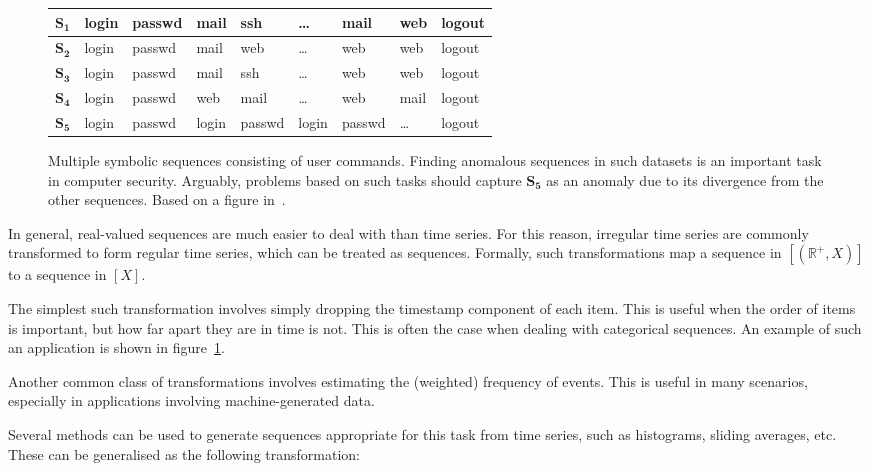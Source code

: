 \begin{figure}[htb]
    \begin{center}
        \begin{tabular}{| l | l l l l l l l l |}
            \hline
            $\mathbf{S_1}$ & login & passwd & mail & ssh & \dots & mail & web & logout \\ \hline
            $\mathbf{S_2}$ & login & passwd & mail & web & \dots & web & web & logout \\ \hline
            $\mathbf{S_3}$ & login & passwd & mail & ssh & \dots & web & web & logout \\ \hline
            $\mathbf{S_4}$ & login & passwd & web & mail & \dots & web & mail & logout \\ \hline
            $\mathbf{S_5}$ & login & passwd & login & passwd & login & passwd & \dots & logout \\\hline
        \end{tabular}
    \end{center}
    \caption{{\small Multiple symbolic sequences consisting of user commands. Finding anomalous sequences in such datasets is an important task in computer security. Arguably, problems based on such tasks should capture $\mathbf{S_5}$ as an anomaly due to its divergence from the other sequences. Based on a figure in~\cite{chandola2}.}}
\label{fig:calls}
\end{figure}

In general, real-valued sequences are much easier to deal with than time series. For this reason, irregular time series are commonly transformed to form regular time series, which can be treated as sequences. Formally, such transformations map a sequence in $[(\mathbb{R}^+, X)]$ to a sequence in $[X]$.

The simplest such transformation involves simply dropping the timestamp component of each item. This is useful when the order of items is important, but how far apart they are in time is not. This is often the case when dealing with categorical sequences. An example of such an application is shown in figure~\ref{fig:calls}.

Another common class of transformations involves estimating the (weighted) frequency of events. This is useful in many scenarios, especially in applications involving machine-generated data.

Several methods can be used to generate sequences appropriate for this task from time series, such as histograms, sliding averages, etc. These can be generalised as the following transformation:

